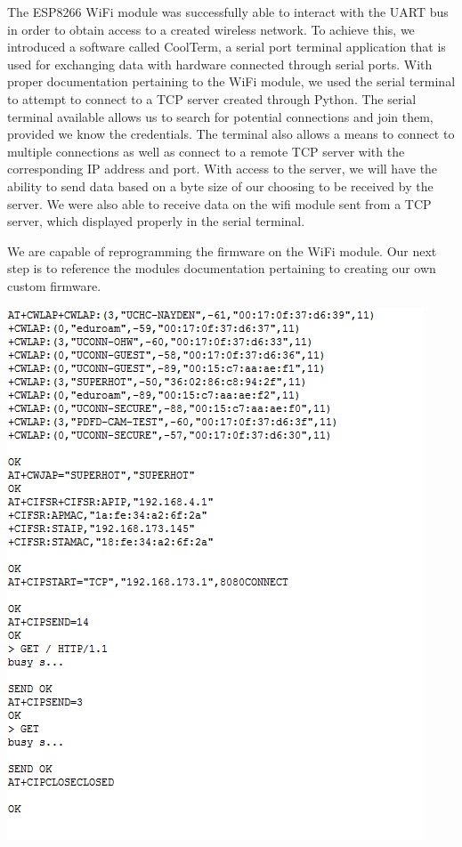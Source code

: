 \documentclass{article}
\begin{document}
The ESP8266 WiFi module was successfully able to interact with the UART bus in order to obtain access to a created wireless network. To achieve this, we introduced a software called CoolTerm, a serial port terminal application that is used for exchanging data with hardware connected through serial ports. With proper documentation pertaining to the WiFi module, we used the serial terminal to attempt to connect to a TCP server created through Python. The serial terminal available allows us to search for potential connections and join them, provided we know the credentials. The terminal also allows a means to connect to multiple connections as well as connect to a remote TCP server with the corresponding IP address and port. With access to the server, we will have the ability to send data based on a byte size of our choosing to be received by the server. We were also able to receive data on the wifi module sent from a TCP server, which displayed properly in the serial terminal.

\indent

We are capable of reprogramming the firmware on the WiFi module. Our next step is to reference the modules documentation pertaining to creating our own custom firmware.

\centerline{\includegraphics[scale=.5]{SerialMonitor}}
\end{document}
